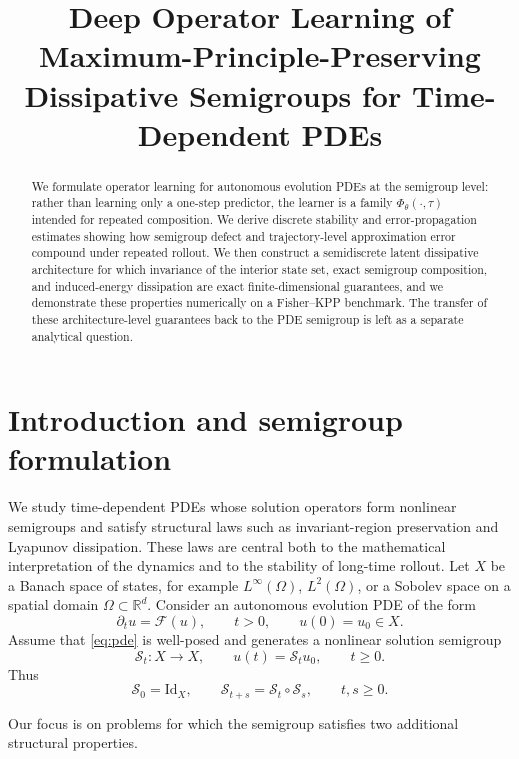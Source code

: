 \documentclass[11pt]{article}
\title{Deep Operator Learning of Maximum-Principle-Preserving Dissipative Semigroups for Time-Dependent PDEs}
\author{}
\date{}
\newcommand{\R}{\mathbb{R}}
\newcommand{\cS}{\mathcal{S}}
\newcommand{\cF}{\mathcal{F}}
\begin{document}
\maketitle

\begin{abstract}
We formulate operator learning for autonomous evolution PDEs at the semigroup level: rather than learning only a one-step predictor, the learner is a family \(\Phi_{\theta}(\cdot,\tau)\) intended for repeated composition. We derive discrete stability and error-propagation estimates showing how semigroup defect and trajectory-level approximation error compound under repeated rollout. We then construct a semidiscrete latent dissipative architecture for which invariance of the interior state set, exact semigroup composition, and induced-energy dissipation are exact finite-dimensional guarantees, and we demonstrate these properties numerically on a Fisher--KPP benchmark. The transfer of these architecture-level guarantees back to the PDE semigroup is left as a separate analytical question.
\end{abstract}

\section{Introduction and semigroup formulation}
We study time-dependent PDEs whose solution operators form nonlinear semigroups and satisfy structural laws such as invariant-region preservation and Lyapunov dissipation. These laws are central both to the mathematical interpretation of the dynamics and to the stability of long-time rollout. Let \(X\) be a Banach space of states, for example \(L^{\infty}(\Omega)\), \(L^2(\Omega)\), or a Sobolev space on a spatial domain \(\Omega\subset \R^d\). Consider an autonomous evolution PDE of the form
\begin{equation}\label{eq:pde}
\partial_t u = \cF(u), \qquad t>0, \qquad u(0)=u_0\in X.
\end{equation}
Assume that \eqref{eq:pde} is well-posed and generates a nonlinear solution semigroup
\begin{equation}\label{eq:semigroup-family}
\cS_t : X \to X, \qquad u(t)=\cS_tu_0, \qquad t\ge 0.
\end{equation}
Thus
\begin{equation}\label{eq:semigroup-law}
\cS_0 = \mathrm{Id}_X, \qquad \cS_{t+s}=\cS_t\circ \cS_s, \qquad t,s\ge 0.
\end{equation}

Our focus is on problems for which the semigroup satisfies two additional structural properties.
\end{document}
